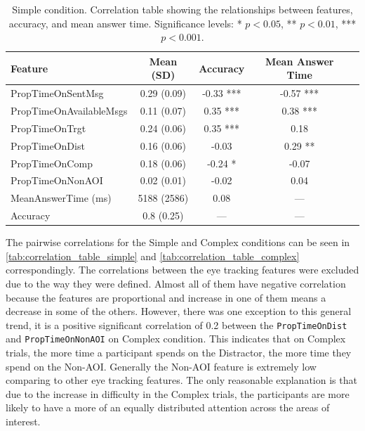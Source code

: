 \begin{table}[h!]
\centering
\begin{tabular}{|l|c|c|c|c|}
\hline
\textbf{Feature} & \textbf{Mean (SD)} & \textbf{Accuracy} & \textbf{Mean Answer Time} \\ \hline
PropTimeOnSentMsg & 0.29 (0.09) & -0.33 *** & -0.57 *** \\ \hline
PropTimeOnAvailableMsgs & 0.11 (0.07) & 0.35 *** & 0.38 *** \\ \hline
PropTimeOnTrgt & 0.24 (0.06) & 0.35 *** & 0.18 \\ \hline
PropTimeOnDist & 0.16 (0.06) & -0.03 & 0.29 ** \\ \hline
PropTimeOnComp & 0.18 (0.06) & -0.24 * & -0.07 \\ \hline
PropTimeOnNonAOI & 0.02 (0.01) & -0.02 & 0.04 \\ \hline
MeanAnswerTime (ms) & 5188 (2586) & 0.08 & --- \\ \hline
Accuracy & 0.8 (0.25) & --- & --- \\ \hline
\end{tabular}
\caption{Simple condition. Correlation table showing the relationships between features, accuracy, and mean answer time. Significance levels: * $p < 0.05$, ** $p < 0.01$, *** $p < 0.001$.}
\label{tab:correlation_table_simple}
\end{table}

The pairwise correlations for the Simple and Complex conditions can be seen in \autoref{tab:correlation_table_simple} and \autoref{tab:correlation_table_complex} correspondingly. The correlations between the eye tracking features were excluded due to the way they were defined. Almost all of them have negative correlation because the features are proportional and increase in one of them means a decrease in some of the others. However, there was one exception to this general trend, it is a positive significant correlation of 0.2 between the \texttt{PropTimeOnDist} and \texttt{PropTimeOnNonAOI} on Complex condition. This indicates that on Complex trials, the more time a participant spends on the Distractor, the more time they spend on the Non-AOI. Generally the Non-AOI feature is extremely low comparing to other eye tracking features. The only reasonable explanation is that due to the increase in difficulty in the Complex trials, the participants are more likely to have a more of an equally distributed attention across the areas of interest.

